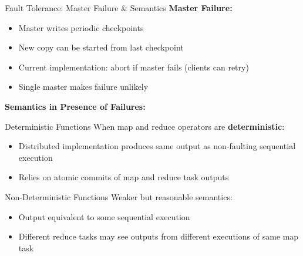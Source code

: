 \documentclass[aspectratio=169]{beamer}
\begin{document}
\begin{frame}{Fault Tolerance: Master Failure \& Semantics}
\textbf{Master Failure:}
\begin{itemize}
    \item Master writes periodic checkpoints
    \item New copy can be started from last checkpoint
    \item Current implementation: abort if master fails (clients can retry)
    \item Single master makes failure unlikely
\end{itemize}

\vspace{0.3cm}

\textbf{Semantics in Presence of Failures:}

\begin{block}{Deterministic Functions}
When map and reduce operators are \textbf{deterministic}:
\begin{itemize}
    \item Distributed implementation produces same output as non-faulting sequential execution
    \item Relies on atomic commits of map and reduce task outputs
\end{itemize}
\end{block}

\begin{block}{Non-Deterministic Functions}
Weaker but reasonable semantics:
\begin{itemize}
    \item Output equivalent to some sequential execution
    \item Different reduce tasks may see outputs from different executions of same map task
\end{itemize}
\end{block}
\end{frame}
\end{document}
